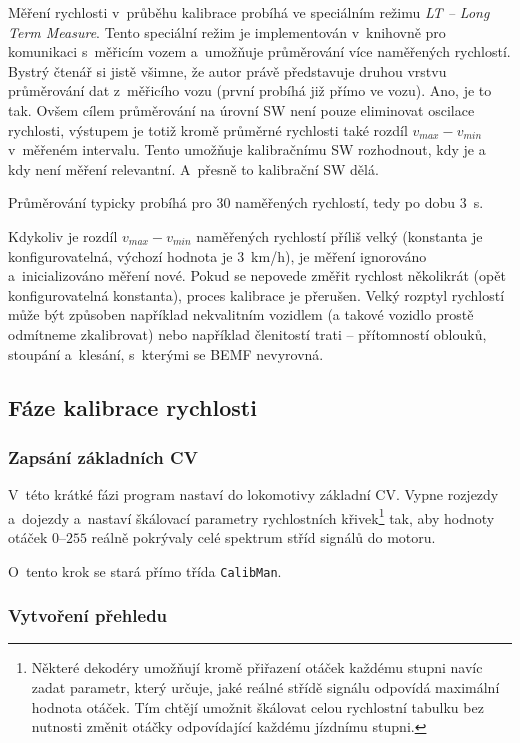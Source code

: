 Měření rychlosti v~průběhu kalibrace probíhá ve speciálním režimu \textit{\gls{LT} --
Long Term Measure}. Tento speciální režim je implementován v~knihov\-ně pro komunikaci
s~měřicím vozem a~umožňuje průměrování více naměřených rychlostí. Bystrý čtenář si
jistě všimne, že autor právě představuje druhou vrstvu průměrování dat
z~měřicího vozu (první probíhá již přímo ve vozu). Ano, je to tak. Ovšem cílem
průměrování na úrovní SW není pouze eliminovat oscilace rychlosti, výstupem
je totiž kromě průměrné rychlosti také rozdíl $v_{max} - v_{min}$ v~měřeném
intervalu. Tento  umožňuje kalibračnímu SW rozhodnout, kdy
je a kdy není měření relevantní. A~přesně to kalibrační SW dělá.

Průměrování typicky probíhá pro $30$ naměřených rychlostí, tedy po dobu $3$~s.

Kdykoliv je rozdíl $v_{max} - v_{min}$ naměřených rychlostí příliš velký
(konstanta je konfigurovatelná, výchozí hodnota je $3$~km/h), je
měření ignorováno a~inicializováno měření nové. Pokud se nepovede změřit
rychlost několikrát (opět konfigurovatelná konstanta), proces kalibrace je
přerušen. Velký rozptyl rychlostí může být způsoben například nekvalitním
vozidlem (a takové vozidlo prostě odmítneme zkalibrovat) nebo například
členitostí trati -- přítomností oblouků, stoupání a~klesání, s~kterými se \gls{BEMF}
nevyrovná.

\subsection{Fáze kalibrace rychlosti}

\subsubsection{Zapsání základních \gls{CV}}

V~této krátké fázi program nastaví do lokomotivy základní \gls{CV}. Vypne rozjezdy
a~dojezdy a~nastaví škálovací parametry rychlostních křivek\footnote{Některé
dekodéry umožňují kromě přiřazení otáček každému stupni navíc zadat parametr,
který určuje, jaké reálné střídě signálu odpovídá maximální hodnota otáček.
Tím chtějí umožnit škálovat celou rychlostní tabulku bez nutnosti změnit otáčky
odpovídající každému jízdnímu stupni.} tak, aby hodnoty otáček $0$--$255$
reálně pokrývaly celé spektrum stříd signálů do motoru.

O~tento krok se stará přímo třída \texttt{CalibMan}.

\subsubsection{Vytvoření přehledu}


